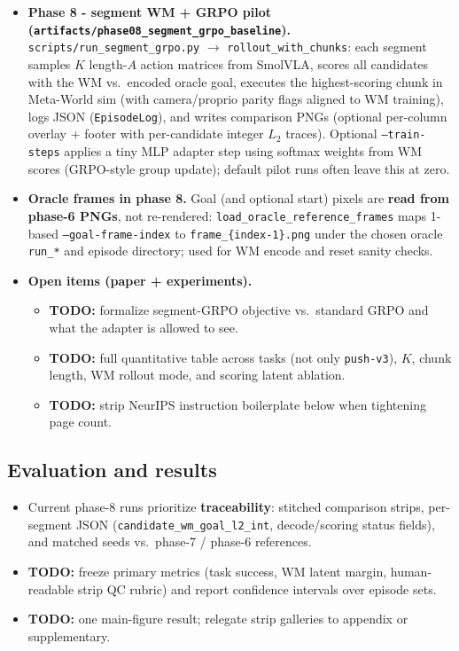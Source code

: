 \documentclass{article}
\begin{document}
\begin{itemize}
  \item \textbf{Phase 8  -  segment WM + GRPO pilot (\texttt{artifacts/phase08\_segment\_grpo\_baseline}).} \texttt{scripts/run\_segment\_grpo.py} $\rightarrow$ \texttt{rollout\_with\_chunks}: each segment samples $K$ length-$A$ action matrices from SmolVLA, scores all candidates with the WM vs.\ encoded oracle goal, executes the highest-scoring chunk in Meta-World sim (with camera/proprio parity flags aligned to WM training), logs JSON (\texttt{EpisodeLog}), and writes comparison PNGs (optional per-column overlay + footer with per-candidate integer $L_2$ traces). Optional \texttt{--train-steps} applies a tiny MLP adapter step using softmax weights from WM scores (GRPO-style group update); default pilot runs often leave this at zero.

  \item \textbf{Oracle frames in phase 8.} Goal (and optional start) pixels are \textbf{read from phase-6 PNGs}, not re-rendered: \texttt{load\_oracle\_reference\_frames} maps 1-based \texttt{--goal-frame-index} to \texttt{frame\_\{index-1\}.png} under the chosen oracle \texttt{run\_*} and episode directory; used for WM encode and reset sanity checks.

  \item \textbf{Open items (paper + experiments).}
  \begin{itemize}
    \item \textbf{TODO:} formalize segment-GRPO objective vs.\ standard GRPO and what the adapter is allowed to see.
    \item \textbf{TODO:} full quantitative table across tasks (not only \texttt{push-v3}), $K$, chunk length, WM rollout mode, and scoring latent ablation.
    \item \textbf{TODO:} strip NeurIPS instruction boilerplate below when tightening page count.
  \end{itemize}
\end{itemize}


\subsection{Evaluation and results}
\begin{itemize}
  \item Current phase-8 runs prioritize \textbf{traceability}: stitched comparison strips, per-segment JSON (\texttt{candidate\_wm\_goal\_l2\_int}, decode/scoring status fields), and matched seeds vs.\ phase-7 / phase-6 references.
  \item \textbf{TODO:} freeze primary metrics (task success, WM latent margin, human-readable strip QC rubric) and report confidence intervals over episode sets.
  \item \textbf{TODO:} one main-figure result; relegate strip galleries to appendix or supplementary.
\end{itemize}
\end{document}
